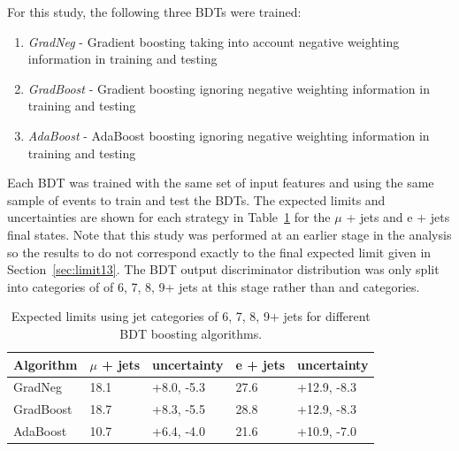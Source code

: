 For this study, the following three BDTs were trained:
\begin{enumerate}
\item \emph{GradNeg} - Gradient boosting taking into account negative weighting information in training and testing
\item \emph{GradBoost} - Gradient boosting ignoring negative weighting information in training and testing
\item \emph{AdaBoost} - AdaBoost boosting ignoring negative weighting information in training and testing
\end{enumerate}
%
Each BDT was trained with the same set of input features and using the same sample of events to train and test the BDTs. The expected limits and uncertainties are shown for each strategy in Table~\ref{tab:BDTalgos} for the $\mu$ + jets and e + jets final states. Note that this study was performed at an earlier stage in the analysis so the results to do not correspond exactly to the final expected limit given in Section~\ref{sec:limit13}. The BDT output discriminator distribution was only split into \njets categories of of 6, 7, 8, 9+ jets at this stage rather than \njets and \nMtags categories.



\begin{table}[ht]
\centering
\caption{Expected limits using jet categories of 6, 7, 8, 9+ jets for different BDT boosting algorithms.}
\label{tab:BDTalgos}
\begin{tabular}{|l|l|l|l|l|}
\hline
Algorithm & $\mu$ + jets & uncertainty & e + jets & uncertainty \\ \hline
GradNeg   & 18.1         & +8.0, -5.3  & 27.6     & +12.9, -8.3 \\ \hline
GradBoost & 18.7         & +8.3, -5.5  & 28.8     & +12.9, -8.3 \\ \hline
AdaBoost  & 10.7         & +6.4, -4.0  & 21.6     & +10.9, -7.0 \\ \hline
\end{tabular}
\end{table}

